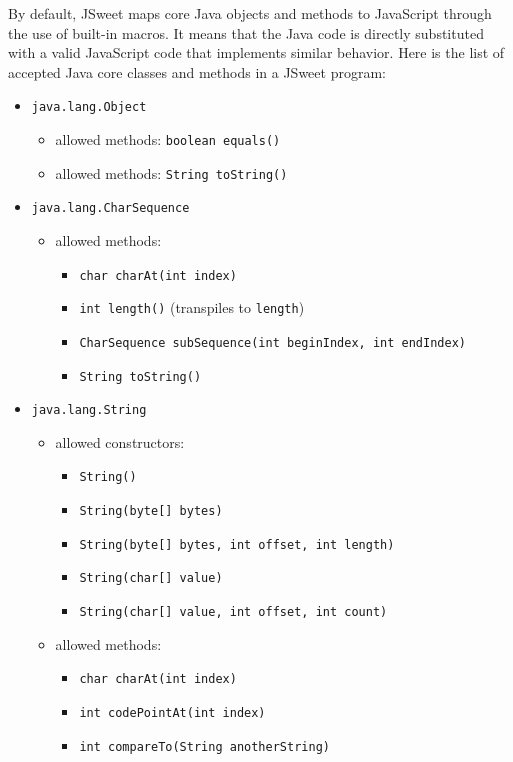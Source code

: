 \documentclass[a4paper]{report}
\begin{document}
By default, JSweet maps core Java objects and methods to JavaScript through the use of built-in macros. It means that the Java code is directly substituted with a valid JavaScript code that implements similar behavior. Here is the list of accepted Java core classes and methods in a JSweet program:

\begin{itemize}
\item \texttt{java.lang.Object}
	\begin{itemize}
	\item allowed methods: \texttt{boolean equals()}
	\item allowed methods: \texttt{String toString()}
	\end{itemize}
\item \texttt{java.lang.CharSequence}
	\begin{itemize}
	\item allowed methods: 
			\begin{itemize}
				\item \texttt{char charAt(int index)}
				\item \texttt{int length()} (transpiles to \texttt{length})
				\item \texttt{CharSequence subSequence(int beginIndex, int endIndex)}
				\item \texttt{String toString()}
			\end{itemize}
	\end{itemize}
\item \texttt{java.lang.String}
	\begin{itemize}
	\item allowed constructors: 
			\begin{itemize}
				\item \texttt{String()}
				\item \texttt{String(byte[] bytes)}
				\item \texttt{String(byte[] bytes, int offset, int length)}
				\item \texttt{String(char[] value)}
				\item \texttt{String(char[] value, int offset, int count)}
			\end{itemize}
	\item allowed methods: 
			\begin{itemize}
				\item \texttt{char charAt(int index)}
				\item \texttt{int codePointAt(int index)}
				\item \texttt{int compareTo(String anotherString)} 

\end{itemize}
\end{itemize}
\end{itemize}
\end{document}
